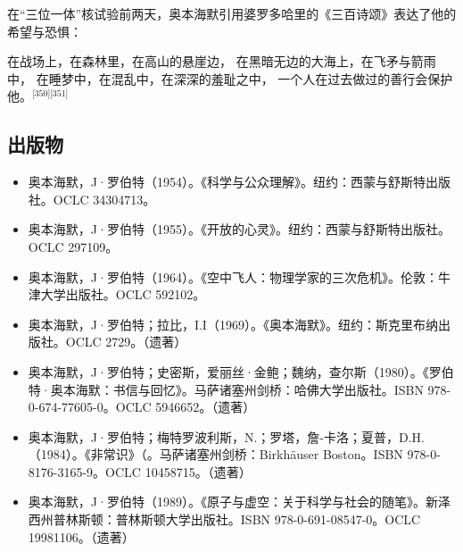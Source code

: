 在“三位一体”核试验前两天，奥本海默引用婆罗多哈里的《三百诗颂》表达了他的希望与恐惧：

在战场上，在森林里，在高山的悬崖边，
在黑暗无边的大海上，在飞矛与箭雨中，
在睡梦中，在混乱中，在深深的羞耻之中，
一个人在过去做过的善行会保护他。\(^\text{[350][351]}\)
\subsection{出版物}
\begin{itemize}
\item 奥本海默，J·罗伯特（1954）。《科学与公众理解》。纽约：西蒙与舒斯特出版社。OCLC 34304713。
\item 奥本海默，J·罗伯特（1955）。《开放的心灵》。纽约：西蒙与舒斯特出版社。OCLC 297109。
\item 奥本海默，J·罗伯特（1964）。《空中飞人：物理学家的三次危机》。伦敦：牛津大学出版社。OCLC 592102。
\item 奥本海默，J·罗伯特；拉比，I.I（1969）。《奥本海默》。纽约：斯克里布纳出版社。OCLC 2729。（遗著）
\item 奥本海默，J·罗伯特；史密斯，爱丽丝·金鲍；魏纳，查尔斯（1980）。《罗伯特·奥本海默：书信与回忆》。马萨诸塞州剑桥：哈佛大学出版社。ISBN 978-0-674-77605-0。OCLC 5946652。（遗著）
\item 奥本海默，J·罗伯特；梅特罗波利斯，N.；罗塔，詹-卡洛；夏普，D.H.（1984）。《非常识》（。马萨诸塞州剑桥：Birkhäuser Boston。ISBN 978-0-8176-3165-9。OCLC 10458715。（遗著）
\item 奥本海默，J·罗伯特（1989）。《原子与虚空：关于科学与社会的随笔》。新泽西州普林斯顿：普林斯顿大学出版社。ISBN 978-0-691-08547-0。OCLC 19981106。（遗著）
\end{itemize}

